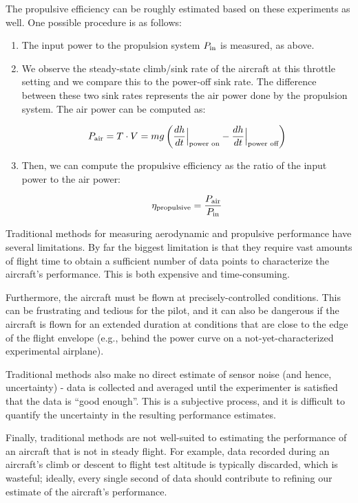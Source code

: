 \documentclass[conf]{new-aiaa}
\begin{document}
    The propulsive efficiency can be roughly estimated based on these experiments as well. One possible procedure is as follows:

    \begin{enumerate}
        \item The input power to the propulsion system $P_{\rm in}$ is measured, as above.
        \item We observe the steady-state climb/sink rate of the aircraft at this throttle setting and we compare this to the power-off sink rate. The difference between these two sink rates represents the air power done by the propulsion system. The air power can be computed as:

        $$P_{\rm air}=T \cdot V = m g \left( \frac{dh}{dt}\Big |_\text{power on} - \frac{dh}{dt}\Big |_\text{power off} \right)$$

        \item Then, we can compute the propulsive efficiency as the ratio of the input power to the air power:

        $$\eta_{\rm propulsive} = \frac{P_{\rm air}}{P_{\rm in}}$$

    \end{enumerate}

    Traditional methods for measuring aerodynamic and propulsive performance have several limitations. By far the biggest limitation is that they require vast amounts of flight time to obtain a sufficient number of data points to characterize the aircraft's performance. This is both expensive and time-consuming.

    Furthermore, the aircraft must be flown at precisely-controlled conditions. This can be frustrating and tedious for the pilot, and it can also be dangerous if the aircraft is flown for an extended duration at conditions that are close to the edge of the flight envelope (e.g., behind the power curve on a not-yet-characterized experimental airplane).

    Traditional methods also make no direct estimate of sensor noise (and hence, uncertainty) - data is collected and averaged until the experimenter is satisfied that the data is ``good enough''. This is a subjective process, and it is difficult to quantify the uncertainty in the resulting performance estimates.

    Finally, traditional methods are not well-suited to estimating the performance of an aircraft that is not in steady flight. For example, data recorded during an aircraft's climb or descent to flight test altitude is typically discarded, which is wasteful; ideally, every single second of data should contribute to refining our estimate of the aircraft's performance.
\end{document}
